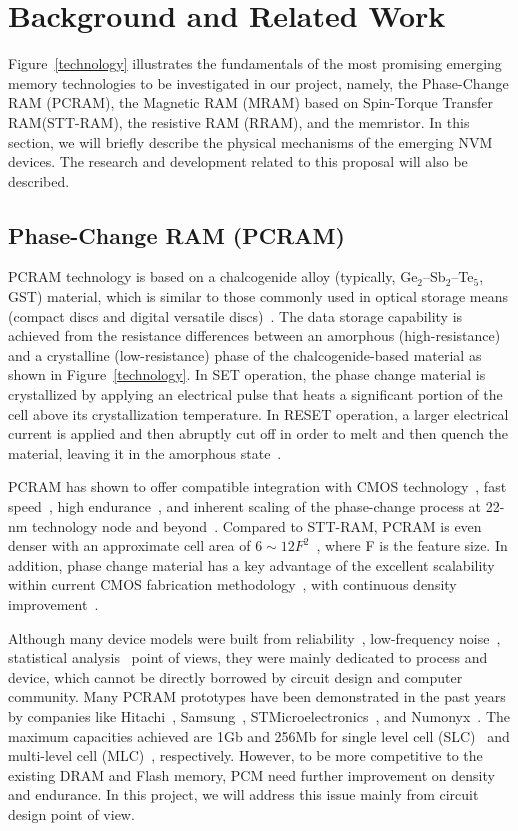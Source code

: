 \section{Background and Related Work}

Figure~\ref{technology} illustrates the fundamentals of the most promising emerging memory technologies to be investigated in our project, namely, the Phase-Change RAM (PCRAM), the Magnetic RAM (MRAM) based on Spin-Torque Transfer RAM(STT-RAM), the resistive RAM (RRAM), and the memristor. In this section, we will briefly describe the physical mechanisms of the emerging NVM devices. The research and development related to this proposal will also be described.

\subsection{Phase-Change RAM (PCRAM)}
PCRAM technology is based on a chalcogenide alloy (typically, Ge$_2$--Sb$_2$--Te$_5$, GST) material, which is similar to those commonly used in optical storage means (compact discs and digital versatile discs)~\cite{Bedeschi09}. The data storage capability is achieved from the resistance differences between an amorphous (high-resistance) and a crystalline (low-resistance) phase of the chalcogenide-based material as shown in Figure~\ref{technology}. In SET operation, the phase change material is crystallized by applying an electrical pulse that heats a significant portion of the cell above its crystallization temperature. In RESET operation, a larger electrical current is applied and then abruptly cut off in order to melt and then quench the material, leaving it in the amorphous state~\cite{burr:scm08}. 

PCRAM has shown to offer compatible integration with CMOS technology~\cite{Oh06}, fast speed~\cite{Pirovano03}, high endurance~\cite{Lai03}, and inherent scaling of the phase-change process at 22-nm technology node and beyond~\cite{Chen06}. Compared to STT-RAM, PCRAM is even denser with an approximate cell area of $6\sim12F^2$~\cite{ITRS07}, where F is the feature size. In addition, phase change material has a key advantage of the excellent scalability within current CMOS fabrication methodology~\cite{Cho05,Kim06,Lai01,Pirovano03,Raoux08}, with continuous density improvement~\cite{Nirschl07,Chen07-iedm,Im08}. 

Although many device models were built from reliability~\cite{Ielmini07}, low-frequency noise~\cite{Fantini08}, statistical analysis~\cite{Mantegazza07} point of views, they were mainly dedicated to process and device, which cannot be directly borrowed by circuit design and computer community. Many PCRAM prototypes have been demonstrated in the past years by companies like Hitachi~\cite{Hanzawa07}, Samsung~\cite{Lee07-isscc}, STMicroelectronics~\cite{Bedeschi08, Sandre10}, and Numonyx~\cite{Villa10}. The maximum capacities achieved are 1Gb and 256Mb for single level cell (SLC)~\cite{Villa10} and multi-level cell (MLC)~\cite{Lee07-isscc}, respectively. However, to be more competitive to the existing DRAM and Flash memory, PCM need further improvement on density and endurance. In this project, we will address this issue mainly from circuit design point of view. 

